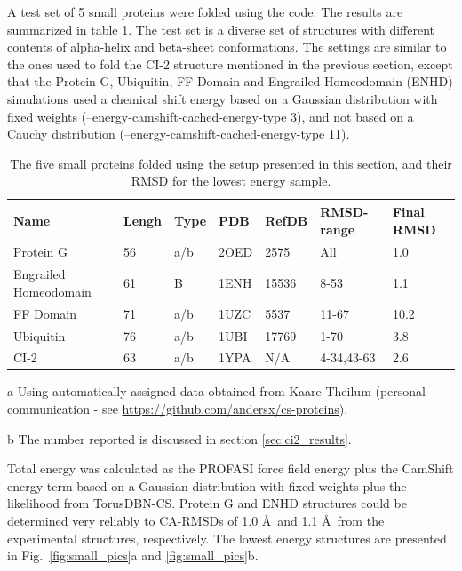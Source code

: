A test set of 5 small proteins were folded using the code. The results are summarized in table \ref{tab:folding_small}. The test set is a diverse set of structures with different contents of alpha-helix and beta-sheet conformations. 
The settings are similar to the ones used to fold the CI-2 structure mentioned in the previous section, except that the Protein G, Ubiquitin, FF Domain and Engrailed Homeodomain (ENHD) simulations used a chemical shift energy based on a Gaussian distribution with fixed weights (--energy-camshift-cached-energy-type 3), and not based on a Cauchy distribution (--energy-camshift-cached-energy-type 11).
\begin{table}
    \caption{The five small proteins folded using the setup presented in this section, and their RMSD for the lowest energy sample.}
    \begin{center}
    \begin{threeparttable}
    \begin{tabular}{l l l l l  l l}
Name                & Lengh    & Type & PDB     & RefDB     & RMSD-range    & Final RMSD   \\\hline
Protein G           & 56       & a/b & 2OED    & 2575      & All           & 1.0           \\
Engrailed Homeodomain & 61     & B   & 1ENH    & 15536     & 8-53          & 1.1           \\
FF Domain           & 71       & a/b & 1UZC    & 5537      & 11-67         & 10.2         \\
Ubiquitin           & 76       & a/b & 1UBI    & 17769     & 1-70          & 3.8           \\
CI-2                & 63       & a/b & 1YPA    & N/A\tnote{a}& 4-34,43-63  & 2.6\tnote{b}
    \end{tabular}
    \begin{tablenotes}
    \item[a] Using automatically assigned data obtained from Kaare Theilum (personal communication - see \url{https://github.com/andersx/cs-proteins}).
    \item[b] The number reported is discussed in section \ref{sec:ci2_results}.
    \end{tablenotes}
    \end{threeparttable}
    \end{center}
    \label{tab:folding_small}
\end{table}
Total energy was calculated as the PROFASI force field energy plus the CamShift energy term based on a Gaussian distribution with fixed weights plus the likelihood from TorusDBN-CS.
Protein G and ENHD structures could be determined very reliably to CA-RMSDs of 1.0 \AA~and 1.1 \AA~from the experimental structures, respectively. The lowest energy structures are presented in Fig.~\ref{fig:small_pics}a and \ref{fig:small_pics}b.

